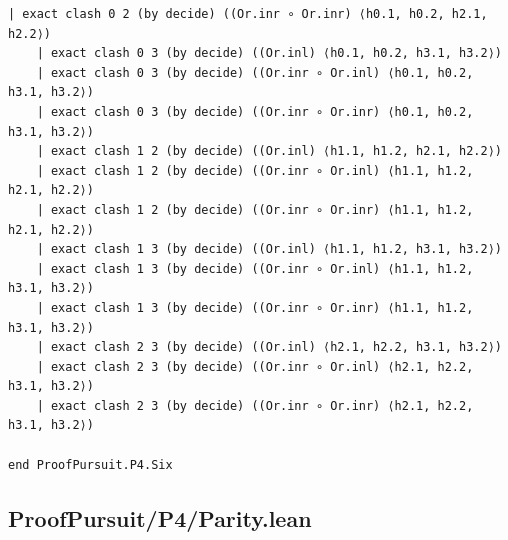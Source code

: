 \documentclass[11pt,a4paper]{article}
\begin{document}
\begin{Verbatim}[breaklines,breakanywhere,fontsize=\footnotesize]
    | exact clash 0 2 (by decide) ((Or.inr ∘ Or.inr) ⟨h0.1, h0.2, h2.1, h2.2⟩)
    | exact clash 0 3 (by decide) ((Or.inl) ⟨h0.1, h0.2, h3.1, h3.2⟩)
    | exact clash 0 3 (by decide) ((Or.inr ∘ Or.inl) ⟨h0.1, h0.2, h3.1, h3.2⟩)
    | exact clash 0 3 (by decide) ((Or.inr ∘ Or.inr) ⟨h0.1, h0.2, h3.1, h3.2⟩)
    | exact clash 1 2 (by decide) ((Or.inl) ⟨h1.1, h1.2, h2.1, h2.2⟩)
    | exact clash 1 2 (by decide) ((Or.inr ∘ Or.inl) ⟨h1.1, h1.2, h2.1, h2.2⟩)
    | exact clash 1 2 (by decide) ((Or.inr ∘ Or.inr) ⟨h1.1, h1.2, h2.1, h2.2⟩)
    | exact clash 1 3 (by decide) ((Or.inl) ⟨h1.1, h1.2, h3.1, h3.2⟩)
    | exact clash 1 3 (by decide) ((Or.inr ∘ Or.inl) ⟨h1.1, h1.2, h3.1, h3.2⟩)
    | exact clash 1 3 (by decide) ((Or.inr ∘ Or.inr) ⟨h1.1, h1.2, h3.1, h3.2⟩)
    | exact clash 2 3 (by decide) ((Or.inl) ⟨h2.1, h2.2, h3.1, h3.2⟩)
    | exact clash 2 3 (by decide) ((Or.inr ∘ Or.inl) ⟨h2.1, h2.2, h3.1, h3.2⟩)
    | exact clash 2 3 (by decide) ((Or.inr ∘ Or.inr) ⟨h2.1, h2.2, h3.1, h3.2⟩)

end ProofPursuit.P4.Six
\end{Verbatim}

\subsection{ProofPursuit/P4/Parity.lean}\label{proofpursuitp4parity.lean}
\end{document}
